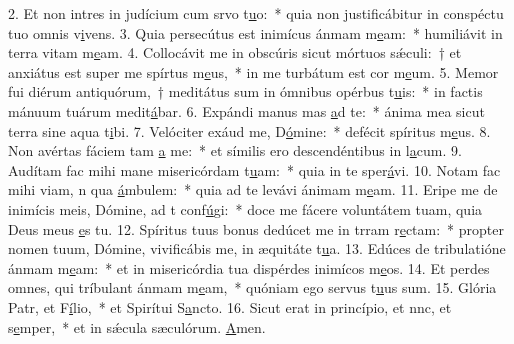 2. Et non intres in judícium cum srvo t\uline{u}o:~* quia non justificábitur in conspéctu tuo omnis v\uline{i}vens.
3. Quia persecútus est inimícus ánmam m\uline{e}am:~* humiliávit in terra vitam m\uline{e}am.
4. Collocávit me in obscúris sicut mórtuos sǽculi:~† et anxiátus est super me spírtus m\uline{e}us,~* in me turbátum est cor m\uline{e}um.
5. Memor fui diérum antiquórum,~† meditátus sum in ómnibus opérbus t\uline{u}is:~* in factis mánuum tuárum medit\uline{á}bar.
6. Expándi manus mas \uline{a}d te:~* ánima mea sicut terra sine aqua t\uline{i}bi.
7. Velóciter exáud me, D\uline{ó}mine:~* defécit spíritus m\uline{e}us.
8. Non avértas fáciem tam \uline{a} me:~* et símilis ero descendéntibus in l\uline{a}cum.
9. Audítam fac mihi mane misericórdam t\uline{u}am:~* quia in te sper\uline{á}vi.
10. Notam fac mihi viam, n qua \uline{á}mbulem:~* quia ad te levávi ánimam m\uline{e}am.
11. Eripe me de inimícis meis, Dómine, ad t conf\uline{ú}gi:~* doce me fácere voluntátem tuam, quia Deus meus \uline{e}s tu.
12. Spíritus tuus bonus dedúcet me in trram r\uline{e}ctam:~* propter nomen tuum, Dómine, vivificábis me, in æquitáte t\uline{u}a.
13. Edúces de tribulatióne ánmam m\uline{e}am:~* et in misericórdia tua dispérdes inimícos m\uline{e}os.
14. Et perdes omnes, qui tríbulant ánmam m\uline{e}am,~* quóniam ego servus t\uline{u}us sum.
15. Glória Patr, et F\uline{í}lio,~* et Spirítui S\uline{a}ncto.
16. Sicut erat in princípio, et nnc, et s\uline{e}mper,~* et in sǽcula sæculórum. \uline{A}men.
